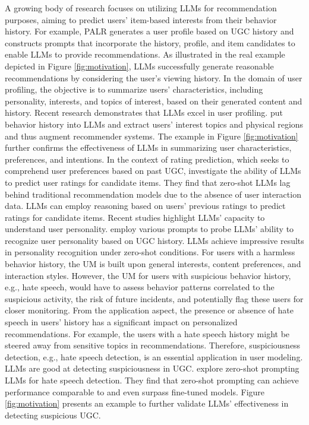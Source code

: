 \documentclass[11pt]{article}
\newcommand{\edit}[1]{\textcolor{blue}{#1}}
\newcommand{\comments}[1]{\textcolor{red}{[Re:~#1]}}
\begin{document}
A growing body of research focuses on utilizing LLMs for recommendation purposes, aiming to predict users' item-based interests from their behavior history. For example, PALR \cite{chen2023palr} generates a user profile based on UGC history and constructs prompts that incorporate the history, profile, and item candidates to enable LLMs to provide recommendations. As illustrated in the real example depicted in Figure \ref{fig:motivation}, LLMs successfully generate reasonable recommendations by considering the user's viewing history. 
In the domain of user profiling, the objective is to summarize users' characteristics, including personality, interests, and topics of interest, based on their generated content and history. Recent research demonstrates that LLMs excel in user profiling. \citet{liu2023once} put behavior history into LLMs and extract users' interest topics and physical regions and thus augment recommender systems. The example in Figure \ref{fig:motivation} further confirms the effectiveness of LLMs in summarizing user characteristics, preferences, and intentions.
In the context of rating prediction, which seeks to comprehend user preferences based on past UGC, \citet{kang2023llms} investigate the ability of LLMs to predict user ratings for candidate items. They find that zero-shot LLMs lag behind traditional recommendation models due to the absence of user interaction data. LLMs can employ reasoning based on users' previous ratings to predict ratings for candidate items.
Recent studies highlight LLMs' capacity to understand user personality. \citet{ji2023chatgpt} employ various prompts to probe LLMs' ability to recognize user personality based on UGC history. LLMs achieve impressive results in personality recognition under zero-shot conditions.
For users with a harmless behavior history, the UM is built upon general interests, content preferences, and interaction styles. However, the UM for users with suspicious behavior history, e.g., hate speech, would have to assess behavior patterns correlated to the suspicious activity, the risk of future incidents, and potentially flag these users for closer monitoring.
From the application aspect, the presence or absence of hate speech in users' history has a significant impact on personalized recommendations. For example, the users with a hate speech history might be steered away from sensitive topics in recommendations. Therefore, suspiciousness detection, e.g., hate speech detection, is an essential application in user modeling.
LLMs are good at detecting suspiciousness in UGC. \citet{del2023respectful} explore zero-shot prompting LLMs for hate speech detection. They find that zero-shot prompting can achieve performance comparable to and even surpass fine-tuned models. Figure \ref{fig:motivation} presents an example to further validate LLMs' effectiveness in detecting suspicious UGC.
\end{document}
